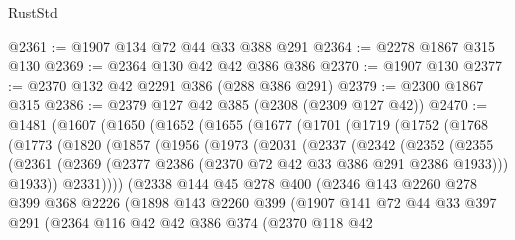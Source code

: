 \begin{lexlean}{RustStd}
\begin{coremodule}
@2361 := @1907 @134 @72 @44 @33 @388 @291
@2364 := @2278 @1867 @315 @130
@2369 := @2364 @130 @42 @42 @386 @386
@2370 := @1907 @130
@2377 := @2370 @132 @42 @2291 @386 (@288 @386 @291)
@2379 := @2300 @1867 @315
@2386 := @2379 @127 @42 @385 (@2308 (@2309 @127 @42))
@2470 := @1481
    (@1607
      (@1650
        (@1652
          (@1655
            (@1677
              (@1701
                (@1719
                  (@1752
                    (@1768
                      (@1773
                        (@1820
                          (@1857
                            (@1956
                              (@1973
                                (@2031
                                  (@2337
                                    (@2342
                                      (@2352
                                        (@2355
                                          (@2361
                                            (@2369
                                              (@2377
                                                @2386
                                                (@2370 @72 @42 @33 @386 @291 @2386 @1933)))
                                            @1933))
                                        @2331))))
                                (@2338
                                  @144
                                  @45
                                  @278
                                  @400
                                  (@2346
                                    @143
                                    @2260
                                    @278
                                    @399
                                    @368
                                    @2226
                                    (@1898
                                      @143
                                      @2260
                                      @399
                                      (@1907
                                        @141
                                        @72
                                        @44
                                        @33
                                        @397
                                        @291
                                        (@2364
                                          @116
                                          @42
                                          @42
                                          @386
                                          @374
                                          (@2370
                                            @118
                                            @42

\end{coremodule}
\end{lexlean}
